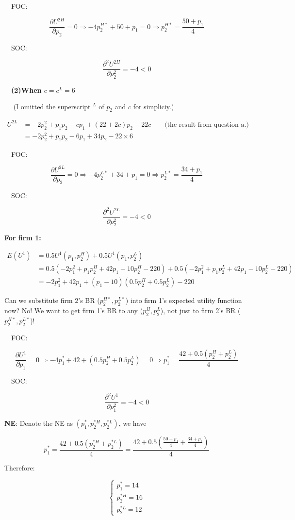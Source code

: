 \documentclass{article}
\begin{document}
$\quad $FOC:

$$\frac{\partial U^{2H}}{\partial p_2} = 0 \Rightarrow -4p^{H*}_2+ 50 + p_1 = 0 \Rightarrow p^{H*}_2 = \frac{50+p_1}{4}$$

$\quad $SOC:

$$\frac{\partial^2 U^{2H}}{\partial p^2_2} = -4 <0$$



\textbf{$\quad $(2)When $c=c^L=6$}

\smallskip

$\quad $ (I omitted the superscript $^L$ of $p_2$ and $c$ for simpliciy.)

\begin{align*}
U^{2L} &= -2p_2^2 +p_1p_2 -cp_1 + (22+2c)p_2 -22c \quad \quad \text{(the result from question a.)}  \\
&= -2p_2^2 +p_1p_2 -6p_1 + 34p_2 -22 \times 6
\end{align*}


$\quad $FOC:

$$\frac{\partial U^{2L}}{\partial p_2} = 0 \Rightarrow -4p^{L*}_2+ 34 + p_1 = 0 \Rightarrow p^{L*}_2 = \frac{34+p_1}{4}$$

$\quad $SOC:

$$\frac{\partial^2 U^{2L}}{\partial p^2_2} = -4 <0$$



\textbf{For firm 1:}

\begin{align*}
E(U^1)&= 0.5 U^1(p_1,p_2^H) + 0.5 U^1(p_1,p_2^L) \\
&= 0.5(-2p_1^2 +p_1p^H_2 + 42p_1 - 10p^H_2 -220) + 0.5(-2p_1^2 +p_1p^L_2 + 42p_1 - 10p^L_2 -220)\\
&=-2p_1^2 + 42p_1 +(p_1 -10)(0.5p^H_2 + 0.5p^L_2) -220
\end{align*}

\begin{mdframed}[backgroundcolor=blue!20,linecolor=white]
Can we substitute firm 2's BR ($p^{H*}_2, p^{L*}_2$) into firm 1's expected utility function now? No! We want to get firm 1's BR to any ($p^H_2, p^L_2$), not just to firm 2's BR ($p^{H*}_2, p^{L*}_2$)!
\end{mdframed}


$\quad $FOC:

$$\frac{\partial U^{1}}{\partial p_1} = 0 \Rightarrow -4p^{*}_1+ 42 +(0.5p^H_2 + 0.5p^L_2) = 0 \Rightarrow p^{*}_1 = \frac{42 + 0.5(p^H_2 + p^L_2)}{4}$$

$\quad $SOC:

$$\frac{\partial^2 U^{1}}{\partial p^2_1} = -4 <0$$


\textbf{NE}: Denote the NE as $(p^*_1,p^{*H}_2,p^{*L}_2)$, we have


$$p^{*}_1 = \frac{42 + 0.5(p^{*H}_2 + p^{*L}_2)}{4}= \frac{42 + 0.5(\frac{50+p_1}{4} + \frac{34+p_1}{4})}{4} $$

Therefore: 

\begin{equation}
    \begin{cases}
p^*_1 = 14 \\ p^{*H}_2 = 16 \\ p^{*L}_2 =12
    \end{cases}
\nonumber
\end{equation}
\end{document}
